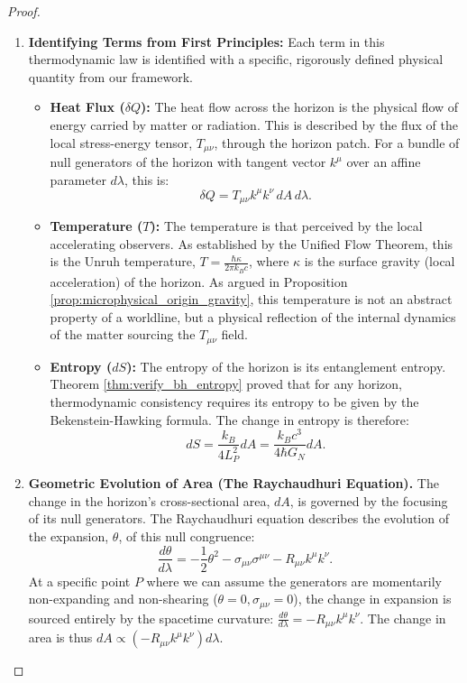 \documentclass[11pt, letterpaper]{report}
\theoremstyle{plain} %
\theoremstyle{definition} %
\theoremstyle{remark} %
\begin{document}
\begin{proof}
\begin{enumerate}
    \item \textbf{Identifying Terms from First Principles:} Each term in this thermodynamic law is identified with a specific, rigorously defined physical quantity from our framework.
        \begin{itemize}
            \item \textbf{Heat Flux ($\delta Q$):} The heat flow across the horizon is the physical flow of energy carried by matter or radiation. This is described by the flux of the local stress-energy tensor, $T_{\mu\nu}$, through the horizon patch. For a bundle of null generators of the horizon with tangent vector $k^\mu$ over an affine parameter $d\lambda$, this is:
            $$ \delta Q = T_{\mu\nu}k^\mu k^\nu \, dA \, d\lambda. $$
            \item \textbf{Temperature ($T$):} The temperature is that perceived by the local accelerating observers. As established by the Unified Flow Theorem, this is the Unruh temperature, $T = \frac{\hbar \kappa}{2\pi k_B c}$, where $\kappa$ is the surface gravity (local acceleration) of the horizon. As argued in Proposition \ref{prop:microphysical_origin_gravity}, this temperature is not an abstract property of a worldline, but a physical reflection of the internal dynamics of the matter sourcing the $T_{\mu\nu}$ field.
            \item \textbf{Entropy ($dS$):} The entropy of the horizon is its entanglement entropy. Theorem \ref{thm:verify_bh_entropy} proved that for any horizon, thermodynamic consistency requires its entropy to be given by the Bekenstein-Hawking formula. The change in entropy is therefore:
            $$ dS = \frac{k_B}{4 L_P^2} dA = \frac{k_B c^3}{4\hbar G_N} dA. $$
        \end{itemize}

    \item \textbf{Geometric Evolution of Area (The Raychaudhuri Equation).} The change in the horizon's cross-sectional area, $dA$, is governed by the focusing of its null generators. The Raychaudhuri equation \cite{Raychaudhuri1955} describes the evolution of the expansion, $\theta$, of this null congruence:
    $$ \frac{d\theta}{d\lambda} = -\frac{1}{2}\theta^2 - \sigma_{\mu\nu}\sigma^{\mu\nu} - R_{\mu\nu}k^\mu k^\nu. $$
    At a specific point $P$ where we can assume the generators are momentarily non-expanding and non-shearing ($\theta=0, \sigma_{\mu\nu}=0$), the change in expansion is sourced entirely by the spacetime curvature: $\frac{d\theta}{d\lambda} = - R_{\mu\nu}k^\mu k^\nu$. The change in area is thus $dA \propto (-R_{\mu\nu}k^\mu k^\nu) d\lambda$.


\end{enumerate}
\end{proof}
\end{document}

